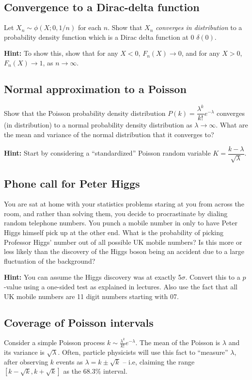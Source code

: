 \subsection{Convergence to a Dirac-delta function}

Let $X_{n}\sim\phi(X;0,1/n)$ for each $n$. Show that $X_{n}$ \emph{converges in distribution} to a probability density function which is a Dirac delta function at 0 $\delta(0)$. 

\textbf{Hint:} To show this, show that for any $X<0$, $F_{n}(X)\rightarrow 0$, and for any $X>0$, $F_{n}(X)\rightarrow 1$, as $n\rightarrow \infty$.


\subsection{Normal approximation to a Poisson}

Show that the Poisson probability density distribution $P(k)=\dfrac{\lambda^{k}}{k!}e^{-\lambda}$ converges (in distribution) to a normal probability density distribution as $\lambda\rightarrow\infty$. What are the mean and variance of the normal distribution that it converges to?

\textbf{Hint:} Start by considering a ``standardized'' Poisson random variable $K=\dfrac{k-\lambda}{\sqrt{\lambda}}$.

\subsection{Phone call for Peter Higgs}

You are sat at home with your statistics problems staring at you from across the room, and rather than solving them, you decide to procrastinate by dialing random telephone numbers. You punch a mobile number in only to have Peter Higgs himself pick up at the other end. What is the probability of picking Professor Higgs' number out of all possible UK mobile numbers? Is this more or less likely than the discovery of the Higgs boson being an accident due to a large fluctuation of the background?

\textbf{Hint:} You can assume the Higgs discovery was at exactly 5$\sigma$. Convert this to a $p$-value using a one-sided test as explained in lectures. Also use the fact that all UK mobile numbers are 11 digit numbers starting with 07. 

\subsection{Coverage of Poisson intervals}
Consider a simple Poisson process $k\sim \frac{\lambda^{k}}{k!}e^{-\lambda}$. The mean of the Poisson is $\lambda$ and its variance is $\sqrt{\lambda}$. Often, particle physicists will use this fact to ``measure'' $\lambda$, after observing $k$ events as $\lambda=k\pm\sqrt{k}$ -- i.e, claiming the range $[k-\sqrt{k},k+\sqrt{k}]$ as the 68.3\% interval. 

